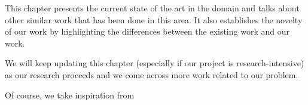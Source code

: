 This chapter presents the current state of the art in the domain and talks about other similar work that has been done in this area. It also establishes the novelty of our work by highlighting the differences between the existing work and our work.

We will keep updating this chapter (especially if our project is research-intensive) as our research proceeds and we come across more work related to our problem.

Of course, we take inspiration from %